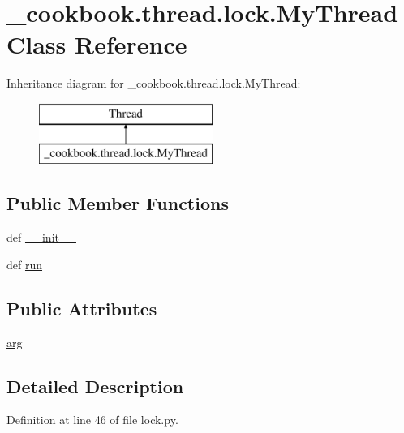 \hypertarget{class__cookbook_1_1thread_1_1lock_1_1MyThread}{\section{\-\_\-cookbook.\-thread.\-lock.\-My\-Thread Class Reference}
\label{class__cookbook_1_1thread_1_1lock_1_1MyThread}
}
Inheritance diagram for \-\_\-cookbook.\-thread.\-lock.\-My\-Thread\-:\begin{figure}[H]
\begin{center}
\leavevmode
\includegraphics[height=2.000000cm]{df/d25/class__cookbook_1_1thread_1_1lock_1_1MyThread}
\end{center}
\end{figure}
\subsection*{Public Member Functions}
\begin{DoxyCompactItemize}
\item 
def \hyperlink{class__cookbook_1_1thread_1_1lock_1_1MyThread_af2698f3a89f72d901670df8bd7050b88}{\-\_\-\-\_\-init\-\_\-\-\_\-}
\item 
def \hyperlink{class__cookbook_1_1thread_1_1lock_1_1MyThread_add32daaabfa40fefc9f0a21bdd7af098}{run}
\end{DoxyCompactItemize}
\subsection*{Public Attributes}
\begin{DoxyCompactItemize}
\item 
\hyperlink{class__cookbook_1_1thread_1_1lock_1_1MyThread_a91f0432528c15cb2a108aa527672709a}{arg}
\end{DoxyCompactItemize}


\subsection{Detailed Description}


Definition at line 46 of file lock.\-py.



